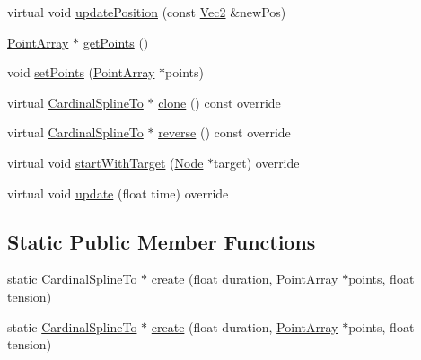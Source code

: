 \begin{DoxyCompactItemize}
\item 
virtual void \hyperlink{classCardinalSplineTo_a18b90e37ad31dd48a7aaa611e6608369}{update\+Position} (const \hyperlink{classVec2}{Vec2} \&new\+Pos)
\item 
\hyperlink{classPointArray}{Point\+Array} $\ast$ \hyperlink{classCardinalSplineTo_a81579b21c78debeaeca0063b46bf9a9d}{get\+Points} ()
\item 
void \hyperlink{classCardinalSplineTo_a303a067d9052d21a6ffc8004c174001b}{set\+Points} (\hyperlink{classPointArray}{Point\+Array} $\ast$points)
\item 
virtual \hyperlink{classCardinalSplineTo}{Cardinal\+Spline\+To} $\ast$ \hyperlink{classCardinalSplineTo_a2203360a7f12e0223870dc8574cbe084}{clone} () const override
\item 
virtual \hyperlink{classCardinalSplineTo}{Cardinal\+Spline\+To} $\ast$ \hyperlink{classCardinalSplineTo_aea43897c48192fa9e19f45c343d0a7fd}{reverse} () const override
\item 
virtual void \hyperlink{classCardinalSplineTo_a395a93dfe6f1d9e9298236bd44f04ade}{start\+With\+Target} (\hyperlink{classNode}{Node} $\ast$target) override
\item 
virtual void \hyperlink{classCardinalSplineTo_a8bad76ed354e2a5ef225e25f39e51184}{update} (float time) override
\end{DoxyCompactItemize}
\subsection*{Static Public Member Functions}
\begin{DoxyCompactItemize}
\item 
static \hyperlink{classCardinalSplineTo}{Cardinal\+Spline\+To} $\ast$ \hyperlink{classCardinalSplineTo_a49dcc4667a5af6476e9b10792735033c}{create} (float duration, \hyperlink{classPointArray}{Point\+Array} $\ast$points, float tension)
\item 
static \hyperlink{classCardinalSplineTo}{Cardinal\+Spline\+To} $\ast$ \hyperlink{classCardinalSplineTo_af78b3f869e29001d3962efe682bb31e3}{create} (float duration, \hyperlink{classPointArray}{Point\+Array} $\ast$points, float tension)
\end{DoxyCompactItemize}
